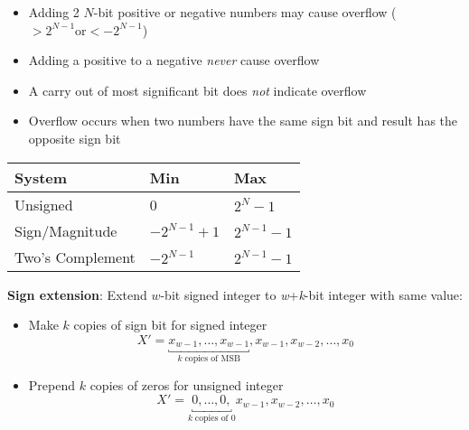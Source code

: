 \begin{itemize}
\item Adding 2 $N$-bit positive or negative numbers may cause overflow ($> 2^{N-1} \text{or} < -2^{N-1}$)
\item Adding a positive to a negative \emph{never} cause overflow
\item A carry out of most significant bit does \emph{not} indicate overflow
\item Overflow occurs when two numbers have the same sign bit and result has the opposite sign bit
\end{itemize}
\begin{tabular}[h]{l|l|l}
  \hline
  System & Min  & Max \\
  \hline
  Unsigned & 0 & $2^{N} - 1$ \\
  \hline
  Sign/Magnitude & $-2^{N-1} + 1$ & $2^{N-1} - 1$ \\
  \hline
  Two's Complement & $-2^{N-1}$ & $2^{N-1} - 1$ \\
  \hline
\end{tabular}

\textbf{Sign extension}: Extend $w$-bit signed integer to \emph{w}+\emph{k}-bit integer with same value:
\begin{itemize}
\item Make $k$ copies of sign bit for signed integer
\[
X' = \underbracket{x_{w-1},\ldots,x_{w-1}}_{k\; \text{copies of MSB}},x_{w-1},x_{w-2},\ldots,x_{0}
\]
\item Prepend $k$ copies of zeros for unsigned integer
\[
X' = \underbracket{0,\ldots,0,}_{k\; \text{copies of }0}x_{w-1},x_{w-2},\ldots,x_{0}
\]
\end{itemize}

